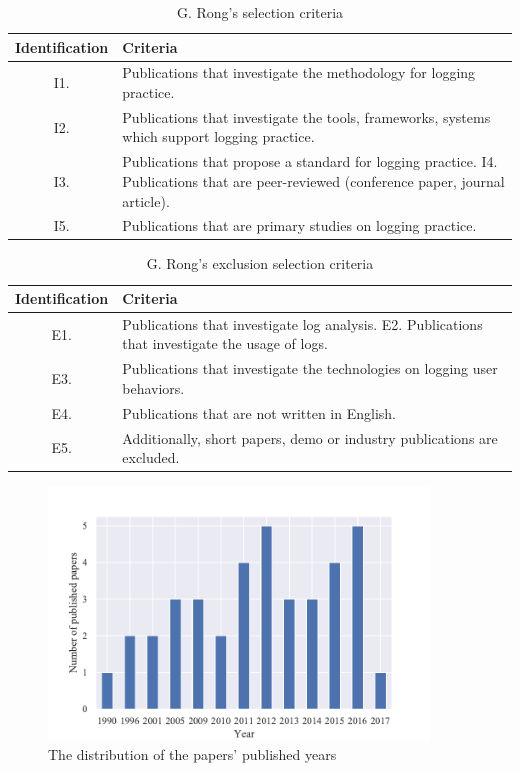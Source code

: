 \begin{table}[!htb]
	\centering
	\small
	\caption{G. Rong's selection criteria \cite{Rong2018a}}
	\label{tbl:CH1_RongIncSelectionCriteria}
	\begin{tabularx}{\textwidth}{|c|X|}
		\hline \textbf{Identification} & \textbf{Criteria} \\
		\hline I1. & Publications that investigate the methodology for logging practice. \\
		\hline I2. & Publications that investigate the tools, frameworks, systems which support logging practice. \\
		\hline I3. & Publications that propose a standard for logging practice. I4. Publications that are peer-reviewed (conference paper, journal article). \\
		\hline I5. & Publications that are primary studies on logging practice. \\
		\hline
	\end{tabularx}
\end{table}

\begin{table}[!htb]
	\centering
	\small
	\caption{G. Rong's exclusion selection criteria \cite{Rong2018a}}
	\label{tbl:CH1_RongExlSelectionCriteria}
	\begin{tabularx}{\textwidth}{|c|X|}
		\hline \textbf{Identification} & \textbf{Criteria} \\
		\hline E1.& Publications that investigate log analysis. E2. Publications that investigate the usage of logs. \\
		\hline E3. & Publications that investigate the technologies on logging user behaviors. \\
		\hline E4. & Publications that are not written in English. \\
		\hline  E5. & Additionally, short papers, demo or industry publications are excluded. \\
		\hline
	\end{tabularx}
\end{table}

\begin{figure}[!htb] %
	\centering %
	\includegraphics[width=0.9\textwidth]{Images/Chapter1/Background/Ronga2018.pdf}
	\caption{The distribution of the papers’ published years \cite{Rong2018a}} \label{fig:CH1_PushblisedPapers}
\end{figure} 

